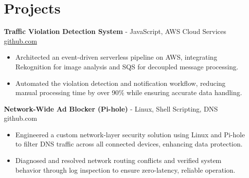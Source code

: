 \documentclass[11pt]{article}       %
\begin{document}

\vspace{-18.5pt}

\section*{Projects}

\textbf{Traffic Violation Detection System}{ - JavaScript, AWS Cloud Services} \hfill \href{https://github.com/Monica20030707/AWS_rekonigition-N-read-database}{github.com} \\
\vspace{-9pt}
\begin{itemize}
  \item Architected an event-driven serverless pipeline on AWS, integrating Rekognition for image analysis and SQS for decoupled message processing.
  \item Automated the violation detection and notification workflow, reducing manual processing time by over 90\% while ensuring accurate data handling.
\end{itemize}

\textbf{Network-Wide Ad Blocker (Pi-hole)}{ - Linux, Shell Scripting, DNS} \hfill github.com \\
\vspace{-9pt}
\begin{itemize}
  \item Engineered a custom network-layer security solution using Linux and Pi-hole to filter DNS traffic across all connected devices, enhancing data protection.
  \item Diagnosed and resolved network routing conflicts and verified system behavior through log inspection to ensure zero-latency, reliable operation.
\end{itemize}
\end{document}
